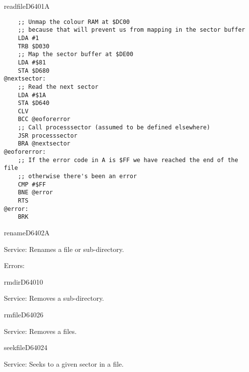 \begin{hyppotrap}{readfile}{D640}{1A}
\begin{tcolorbox}[colback=black,coltext=white]
\verbatimfont{\codefont}
\begin{verbatim}
    ;; Unmap the colour RAM at $DC00
    ;; because that will prevent us from mapping in the sector buffer
    LDA #1
    TRB $D030
    ;; Map the sector buffer at $DE00
    LDA #$81
    STA $D680
@nextsector:
    ;; Read the next sector
    LDA #$1A
    STA $D640
    CLV
    BCC @eoforerror
    ;; Call processsector (assumed to be defined elsewhere)
    JSR processsector
    BRA @nextsector
@eoforerror:
    ;; If the error code in A is $FF we have reached the end of the file
    ;; otherwise there's been an error
    CMP #$FF
    BNE @error
    RTS
@error:
    BRK
\end{verbatim}
\end{tcolorbox}
\end{hyppotrap}


\newpage
\begin{hyppotrap}{rename}{D640}{2A}
\item [Service:]
  Renames a file or sub-directory.
\item [Errors:]
\notimplemented
\end{hyppotrap}


\begin{hyppotrap}{rmdir}{D640}{10}
\item [Service:]
  Removes a sub-directory.
\notimplemented
\end{hyppotrap}


\begin{hyppotrap}{rmfile}{D640}{26}
\item [Service:]
  Removes a files.
\notimplemented
\end{hyppotrap}


\begin{hyppotrap}{seekfile}{D640}{24}
\item [Service:]
  Seeks to a given sector in a file.
\notimplemented
\end{hyppotrap}


